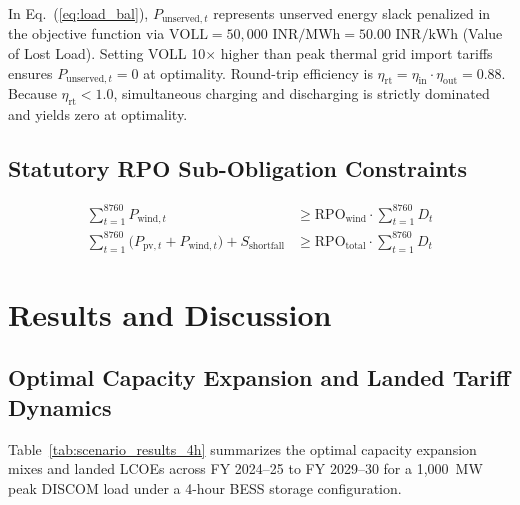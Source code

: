 \documentclass[11pt,a4paper]{article}
\begin{document}
In Eq.~(\ref{eq:load_bal}), $P_{\text{unserved},t}$ represents unserved energy slack penalized in the objective function via $\text{VOLL} = 50,000\text{ INR/MWh} = 50.00\text{ INR/kWh}$ (Value of Lost Load). Setting VOLL 10$\times$ higher than peak thermal grid import tariffs ensures $P_{\text{unserved},t} = 0$ at optimality. Round-trip efficiency is $\eta_{\text{rt}} = \eta_{\text{in}} \cdot \eta_{\text{out}} = 0.88$. Because $\eta_{\text{rt}} < 1.0$, simultaneous charging and discharging is strictly dominated and yields zero at optimality.

\subsection{Statutory RPO Sub-Obligation Constraints}
\label{sec:rpo_const}

\begin{align}
\sum_{t=1}^{8760} P_{\text{wind},t} &\ge \text{RPO}_{\text{wind}} \cdot \sum_{t=1}^{8760} D_t \label{eq:rpo_wind} \\
\sum_{t=1}^{8760} \Big( P_{\text{pv},t} + P_{\text{wind},t} \Big) + S_{\text{shortfall}} &\ge \text{RPO}_{\text{total}} \cdot \sum_{t=1}^{8760} D_t \label{eq:rpo_total}
\end{align}

\section{Results and Discussion}
\label{sec:results}

\subsection{Optimal Capacity Expansion and Landed Tariff Dynamics}

Table~\ref{tab:scenario_results_4h} summarizes the optimal capacity expansion mixes and landed LCOEs across FY 2024--25 to FY 2029--30 for a 1,000~MW peak DISCOM load under a 4-hour BESS storage configuration.
\end{document}
